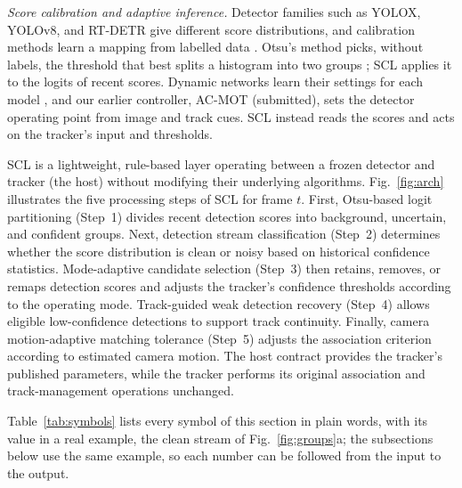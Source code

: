 \documentclass[pdflatex,sn-mathphys-num,iicol]{sn-jnl}
\makeatletter
\newcommand{\scl}{SCL}
\renewcommand\section{\@startsection{section}{1}{\z@}{-10pt \@plus -3pt \@minus -2pt}{6pt}{\sectionfont}}
\makeatother
\begin{document}
\emph{Score calibration and adaptive inference.} Detector families such as YOLOX, YOLOv8, and RT-DETR give different score distributions,
and calibration methods learn a mapping from labelled data \cite{kuppers2020detcalib}. Otsu's
method picks, without labels, the threshold that best splits a histogram into two groups
\cite{otsu1979}; \scl{} applies it to the logits of recent scores. Dynamic networks learn their
settings for each model \cite{han2022dynamic}, and our earlier controller, AC-MOT (submitted), sets the detector operating point from
image and track cues. \scl{} instead reads the scores and acts on the tracker's input and
thresholds.
\section{Proposed SCL Framework}\label{sec:method}

\scl{} is a lightweight, rule-based layer operating between a frozen detector and tracker (the
host) without modifying their underlying algorithms. Fig.~\ref{fig:arch} illustrates the five
processing steps of \scl{} for frame $t$. First, Otsu-based logit partitioning (Step~1) divides
recent detection scores into background, uncertain, and confident groups. Next, detection stream
classification (Step~2) determines whether the score distribution is clean or noisy based on
historical confidence statistics. Mode-adaptive candidate selection (Step~3) then retains,
removes, or remaps detection scores and adjusts the tracker's confidence thresholds according to
the operating mode. Track-guided weak detection recovery (Step~4) allows eligible low-confidence
detections to support track continuity. Finally, camera motion-adaptive matching tolerance
(Step~5) adjusts the association criterion according to estimated camera motion. The host
contract provides the tracker's published parameters, while the tracker performs its original
association and track-management operations unchanged.

Table~\ref{tab:symbols} lists every symbol of this section in plain words, with its value in a
real example, the clean stream of Fig.~\ref{fig:groups}a; the subsections below use the same
example, so each number can be followed from the input to the output.
\end{document}
